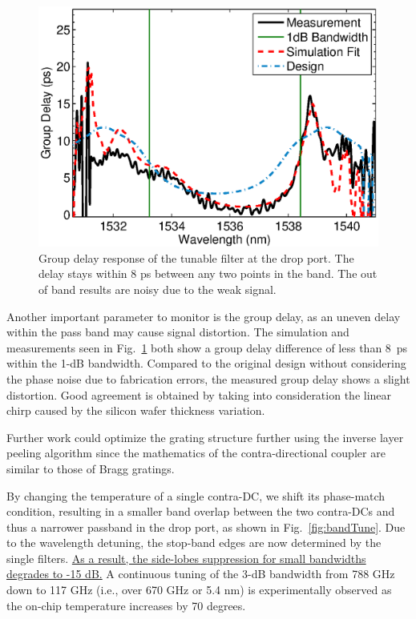 \documentclass[9pt,twocolumn,twoside]{osajnl}
\begin{document}
	\begin{figure}[tbp]
		\centering
		\includegraphics[width=.99\columnwidth]{data/Phase3}
		\caption{ Group delay response of the tunable filter at the drop port. The delay stays within 8 ps between any two points in the band. The out of band results are noisy due to the weak signal.}
		\label{fig:phase}
	\end{figure}
	Another important parameter to monitor is the group delay, as an uneven delay within the pass band may cause signal distortion. The simulation and measurements seen in Fig.~\ref{fig:phase} both show a group delay difference of less than 8~ps within the 1-dB bandwidth. 
	Compared to the original design without considering the phase noise due to fabrication errors, the measured group delay shows a slight distortion. Good agreement is obtained by taking into consideration the linear chirp caused by the silicon wafer thickness variation.
	
	Further work could optimize the grating structure further using the inverse layer peeling algorithm\cite{skaar2001synthesis} since the mathematics of the contra-directional coupler are similar to those of Bragg gratings.
	
	By changing the temperature of a single contra-DC, we shift its phase-match condition, resulting in a smaller band overlap between the two contra-DCs and thus a narrower passband in the drop port, as shown in Fig.~\ref{fig:bandTune}.  
	Due to the wavelength detuning,  the stop-band edges are now determined by the single filters. 
	\uline{As a result, the side-lobes suppression for small bandwidths degrades to -15 dB.}
	A continuous tuning of the 3-dB bandwidth from 788 GHz down to 117 GHz (i.e., over 670 GHz or 5.4 nm) is experimentally observed as the on-chip temperature increases by 70 degrees. 
	
\end{document}

